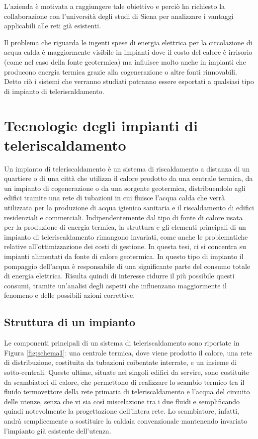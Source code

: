 \documentclass[laurea,oneside,11pt]{USiena_tesiLM3}
\begin{document}
L'azienda è motivata a raggiungere tale obiettivo e perciò ha richiesto la collaborazione con l'università degli studi di Siena per analizzare i vantaggi applicabili alle reti già esistenti.

Il problema che riguarda le ingenti spese di energia elettrica per la circolazione di acqua calda è maggiormente visibile in impianti dove il costo del calore è irrisorio (come nel caso della fonte geotermica) ma influisce molto anche in impianti che producono energia termica grazie alla cogenerazione o altre fonti rinnovabili. Detto ciò i sistemi che verranno studiati potranno essere esportati a qualsiasi tipo di impianto di teleriscaldamento.


\chapter{Tecnologie degli impianti di teleriscaldamento}
Un impianto di teleriscaldamento è un  sistema di riscaldamento a distanza di un quartiere o di una città 
che utilizza il calore prodotto da una centrale termica, da un impianto di cogenerazione o da una sorgente geotermica, distribuendolo agli edifici tramite una rete di tubazioni in cui fluisce l'acqua calda che verrà utilizzata per la produzione di acqua igienico sanitaria e il riscaldamento di edifici residenziali e commerciali. Indipendentemente dal tipo di fonte di calore usata per la produzione di energia termica, la struttura e gli elementi principali di un impianto di teleriscaldamento rimangono invariati, come anche le problematiche relative all'ottimizzazione dei costi di gestione. In questa tesi, ci si concentra su impianti alimentati da fonte di calore geotermica. In questo tipo di impianto il pompaggio dell'acqua è responsabile di una significante parte del consumo totale di energia elettrica. Risulta quindi di interesse ridurre il più possibile questi consumi, tramite un'analisi degli aspetti che influenzano maggiormente il fenomeno e delle possibili azioni correttive. 

\section{Struttura di un impianto}
Le componenti principali di un sistema di teleriscaldamento sono  riportate in Figura \ref{fig:schema1}: una centrale termica, dove viene prodotto il calore, una rete di distribuzione, costituita da tubazioni 
coibentate interrate, e un insieme di sotto-centrali. Queste ultime, situate nei singoli 
edifici da servire, sono costituite da scambiatori di calore, che permettono di realizzare 
lo scambio termico tra il fluido termovettore  della rete primaria di teleriscaldamento e l'acqua del circuito delle utenze, senza che vi sia così miscelazione tra i due fluidi e  semplificando quindi notevolmente la progettazione dell'intera rete. Lo scambiatore, infatti, andrà semplicemente a sostituire la  caldaia convenzionale mantenendo invariato l'impianto già esistente dell'utenza.
\end{document}
